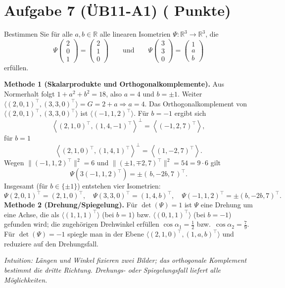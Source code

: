 \documentclass[11pt, a4paper]{article}
\newcommand{\aufgabe}[2]{%
  \section*{\Large\bfseries Aufgabe #1%
  \if\relax\detokenize{#2}\relax\else \hfill\normalfont\normalsize(#2 Punkte)\fi}%
  \vspace{-1.5ex}
}
\begin{document}
\aufgabe{7 (ÜB11-A1)}{}
Bestimmen Sie für alle $a,b\in\mathbb{R}$ alle linearen Isometrien $\Psi:\mathbb{R}^3\to\mathbb{R}^3$, die
\[
\Psi\!\begin{pmatrix}2\\0\\1\end{pmatrix}=\begin{pmatrix}2\\1\\0\end{pmatrix}
\qquad\text{und}\qquad
\Psi\!\begin{pmatrix}3\\3\\0\end{pmatrix}=\begin{pmatrix}1\\ a\\ b\end{pmatrix}
\]
erfüllen.
\begin{framed}
\textbf{Methode 1 (Skalarprodukte und Orthogonalkomplemente).}
Aus Normerhalt folgt $1+a^2+b^2=18$, also $a=4$ und $b=\pm1$. Weiter
$\langle (2,0,1)^\top,(3,3,0)^\top\rangle=G=2+a\Rightarrow a=4$. 
Das Orthogonalkomplement von
$\langle(2,0,1)^\top,(3,3,0)^\top\rangle$ ist
$\langle(-1,1,2)^\top\rangle$.
Für $b=-1$ ergibt sich
\[
\left\langle(2,1,0)^\top,(1,4,-1)^\top\right\rangle^\perp
=\left\langle(-1,2,7)^\top\right\rangle,
\]
für $b=1$
\[
\left\langle(2,1,0)^\top,(1,4,1)^\top\right\rangle^\perp
=\left\langle(1,-2,7)^\top\right\rangle.
\]
Wegen $\|( -1,1,2)^\top\|^2=6$ und $\|( \pm1,\mp2,7)^\top\|^2=54=9\cdot6$
gilt
\[
\Psi\!\left(3(-1,1,2)^\top\right)=\pm(\,b,-2b,7\,)^\top.
\]
Insgesamt (für $b\in\{\pm1\}$) entstehen vier Isometrien:
\[
\Psi(2,0,1)^\top=(2,1,0)^\top,\quad
\Psi(3,3,0)^\top=(1,4,b)^\top,\quad
\Psi(-1,1,2)^\top=\pm(b,-2b,7)^\top.
\]
\smallskip
\textbf{Methode 2 (Drehung/Spiegelung).}
Für $\det(\Psi)=1$ ist $\Psi$ eine Drehung um eine Achse, die als
$\langle(1,1,1)^\top\rangle$ (bei $b=1$) bzw.
$\langle(0,1,1)^\top\rangle$ (bei $b=-1$) gefunden wird; die zugehörigen
Drehwinkel erfüllen $\cos\alpha_1=\tfrac12$ bzw.\ $\cos\alpha_2=\tfrac79$.
Für $\det(\Psi)=-1$ spiegle man in der Ebene
$\langle(2,1,0)^\top,(1,a,b)^\top\rangle$ und reduziere auf den Drehungsfall.

\medskip\noindent\textit{Intuition: Längen und Winkel fixieren zwei Bilder; das orthogonale Komplement bestimmt die dritte Richtung. Drehungs- oder Spiegelungsfall liefert alle Möglichkeiten.}
\end{framed}
\end{document}
